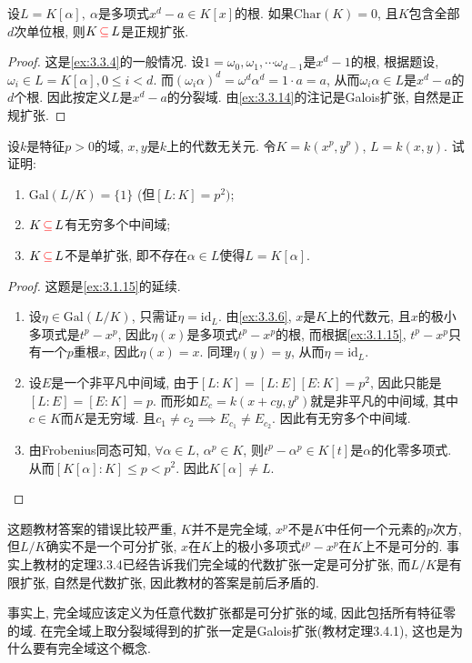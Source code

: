 \begin{problem}
    设$L = K[\alpha],~\alpha$是多项式$x^d - a \in K[x]$的根. 如果$\mathrm{Char}(K) = 0$, 且$K$包含全部$d$次单位根, 则$K \,\textcolor{red}{\subseteq}\, L$是正规扩张.
\end{problem}

\begin{proof}
    这是\ref{ex:3.3.4}的一般情况. 设$1 = \omega_0, \omega_1, \cdots \omega_{d - 1}$是$x^d - 1$的根, 根据题设, $\omega_i \in L = K[\alpha], 0 \leqslant i < d$. 而$(\omega_i\alpha)^d = \omega^d\alpha^d = 1 \cdot a = a$, 从而$\omega_i\alpha \in L$是$x^d - a$的$d$个根. 因此按定义$L$是$x^d - a$的分裂域. 由\ref{ex:3.3.14}的注记是Galois扩张, 自然是正规扩张.
\end{proof}

\begin{problem}[*]\label{ex:3.3.14}
    设$k$是特征$p > 0$的域, $x, y$是$k$上的代数无关元. 令$K = k(x^p, y^p)$, $L = k(x, y)$. 试证明: 
    \begin{enumerate}[(1)]
        \item $\mathrm{Gal}(L/K) = \{1\}$ (但$[L:K] = p^2)$;
        \item $K \,\textcolor{red}{\subseteq}\, L$有无穷多个中间域;
        \item $K \,\textcolor{red}{\subseteq}\, L$不是单扩张, 即不存在$\alpha \in L$使得$L = K[\alpha]$.
    \end{enumerate}
\end{problem}

\begin{proof}
    这题是\ref{ex:3.1.15}的延续.
    \begin{enumerate}[(1)]
        \item 设$\eta \in \mathrm{Gal}(L/K)$, 只需证$\eta = \mathrm{id}_L$. 由\ref{ex:3.3.6}, $x$是$K$上的代数元, 且$x$的极小多项式是$t^p - x^p$, 因此$\eta(x)$是多项式$t^p - x^p$的根, 而根据\ref{ex:3.1.15}, $t^p - x^p$只有一个$p$重根$x$, 因此$\eta(x) = x$. 同理$\eta(y) = y$, 从而$\eta = \mathrm{id}_L$.
        \item 设$E$是一个非平凡中间域, 由于$[L:K] = [L:E][E:K] = p^2$, 因此只能是$[L:E] = [E:K] = p$. 而形如$E_c = k(x + cy, y^p)$就是非平凡的中间域, 其中$c \in K$而$K$是无穷域. 且$c_1 \neq c_2 \implies E_{c_1} \neq E_{c_2}$. 因此有无穷多个中间域.
        \item 由Frobenius同态可知, $\forall \alpha \in L$, $\alpha^p \in K$, 则$t^p - \alpha^p \in K[t]$是$\alpha$的化零多项式. 从而$[K[\alpha]:K] \leqslant p < p^2$. 因此$K[\alpha] \neq L$.
    \end{enumerate}
\end{proof}

\begin{remark}
    这题教材答案的错误比较严重, $K$并不是完全域, $x^p$不是$K$中任何一个元素的$p$次方, 但$L/K$确实不是一个可分扩张, $x$在$K$上的极小多项式$t^p - x^p$在$K$上不是可分的. 事实上教材的定理3.3.4已经告诉我们完全域的代数扩张一定是可分扩张, 而$L/K$是有限扩张, 自然是代数扩张, 因此教材的答案是前后矛盾的.

    事实上, 完全域应该定义为任意代数扩张都是可分扩张的域, 因此包括所有特征零的域. 在完全域上取分裂域得到的扩张一定是Galois扩张(教材定理3.4.1), 这也是为什么要有完全域这个概念.
\end{remark}